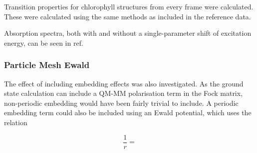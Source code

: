 Transition properties for chlorophyll structures from every frame were calculated.
These were calculated using the same methods as included in the reference data.

Absorption spectra, both with and without a single-parameter shift of excitation
energy, can be seen in ref. 

\subsubsection{Particle Mesh Ewald}
\label{subsubsec:PME}
The effect of including embedding effects was also investigated. As the ground
state calculation can include a QM-MM polarisation term in the Fock matrix, non-periodic 
embedding would have been fairly trivial to include. A periodic embedding term could
also be included using an Ewald potential, which uses the relation

\begin{equation}
\frac{1}{r} = 
\end{equation}

